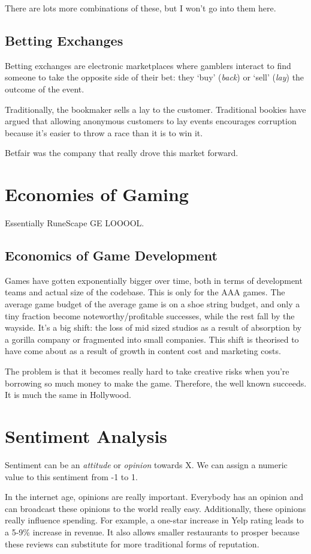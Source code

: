 \documentclass[11pt,a4paper,titlepage,dvipsnames,cmyk]{scrartcl}
\begin{document}
There are lots more combinations of these, but I won't go into them here.

\subsection{Betting Exchanges}
Betting exchanges are electronic marketplaces where gamblers interact to find someone to take the opposite side of their bet: they `buy' (\textit{back}) or `sell' (\textit{lay}) the outcome of the event.

Traditionally, the bookmaker sells a lay to the customer. Traditional bookies have argued that allowing anonymous customers to lay events encourages corruption because it's easier to throw a race than it is to win it.

Betfair was the company that really drove this market forward. 

\section{Economies of Gaming}
Essentially RuneScape GE LOOOOL.

\subsection{Economics of Game Development}
Games have gotten exponentially bigger over time, both in terms of development teams and actual size of the codebase. This is only for the AAA games. The average game budget of the average game is on a shoe string budget, and only a tiny fraction become noteworthy/profitable successes, while the rest fall by the wayside. It's a big shift: the loss of mid sized studios as a result of absorption by a gorilla company or fragmented into small companies. This shift is theorised to have come about as a result of growth in content cost and marketing costs.

The problem is that it becomes really hard to take creative risks when you're borrowing so much money to make the game. Therefore, the well known succeeds. It is much the same in Hollywood.

\section{Sentiment Analysis}
Sentiment can be an \textit{attitude} or \textit{opinion} towards X. We can assign a numeric value to this sentiment from -1 to 1.

In the internet age, opinions are really important. Everybody has an opinion and can broadcast these opinions to the world really easy. Additionally, these opinions really influence spending. For example, a one-star increase in Yelp rating leads to a 5-9\% increase in revenue. It also allows smaller restaurants to prosper because these reviews can substitute for more traditional forms of reputation.
\end{document}
